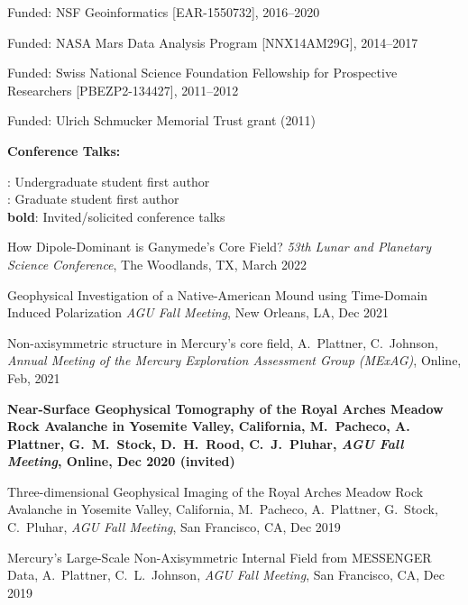 \documentclass[10pt]{article}
\begin{document}
\spcp
  Funded: NSF Geoinformatics
  [EAR-1550732],
  2016--2020

 \spcp 
Funded: NASA Mars Data Analysis Program [NNX14AM29G], 2014--2017

\spcp Funded: Swiss National Science Foundation Fellowship for Prospective Researchers
[PBEZP2-134427], 2011--2012

\spcp
Funded: Ulrich Schmucker Memorial Trust grant (2011)

\spc

\textbf{\tsize Conference Talks:}

\spcp
\ug: Undergraduate student first author\\
\gr: Graduate student first author\\
\textbf{bold}: Invited/solicited conference talks

\spcp
\hspace{-0.4cm} \gr \hspace{-0.03cm} How Dipole-Dominant is Ganymede’s Core Field? \emph{53th Lunar and Planetary Science Conference},
The Woodlands, TX, March 2022


\spcp
Geophysical Investigation of a Native-American Mound using Time-Domain Induced Polarization \emph{AGU Fall Meeting}, New Orleans, LA, Dec 2021


\spcp
Non-axisymmetric structure in Mercury's core field, A.~Plattner, C.~Johnson, \emph{Annual Meeting of the Mercury Exploration Assessment Group (MExAG)}, Online, Feb, 2021

\spcp
\hspace{-0.4cm} \gr \hspace{-0.03cm} \textbf{Near-Surface Geophysical Tomography of the Royal Arches Meadow Rock Avalanche in Yosemite Valley, California, M.~Pacheco, A. Plattner, G.~M.~Stock, D.~H.~Rood, C.~J.~Pluhar, \emph{AGU Fall Meeting}, Online, Dec 2020 (invited)}

\spcp
\hspace{-0.4cm} \gr \hspace{-0.03cm} Three-dimensional Geophysical Imaging of the Royal Arches Meadow Rock Avalanche in Yosemite Valley, California, M.~Pacheco, A.~Plattner, G.~Stock, C.~Pluhar, \emph{AGU Fall Meeting}, San Francisco, CA, Dec 2019

\spcp
Mercury's Large-Scale Non-Axisymmetric Internal Field from MESSENGER Data, A.~Plattner, C.~L.~Johnson, \emph{AGU Fall Meeting}, San Francisco, CA, Dec 2019
\end{document}
